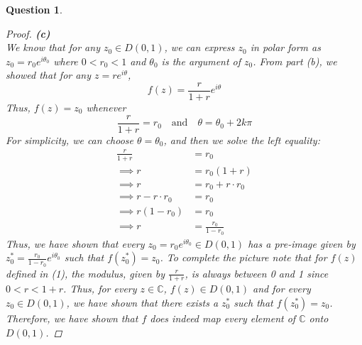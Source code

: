 \documentclass[10pt,a4paper]{article}
\newtheorem*{question*}{Question}
\begin{document}
\begin{question*}{$ $}
\begin{proof}{\textbf{(c)}}
\\We know that for any $z_0 \in D(0,1)$, we can express $z_0$ in polar form as $z_0 = r_0e^{i\theta_0}$ where $0< r_0 < 1$ and $\theta_0$ is the argument of $z_0$. From part (b), we showed that for any $z = re^{i\theta}$, 
\begin{equation}
f(z) = \frac{r}{1 + r}e^{i\theta}
\end{equation}
Thus, $f(z) = z_0$ whenever
\[\frac{r}{1 + r} = r_0 \quad \text{and} \quad \theta = \theta_0 + 2k\pi\]
For simplicity, we can choose $\theta = \theta_0$, and then we solve the left equality:
\begin{align*}
\frac{r}{1 + r} &= r_0\\
\implies r &= r_0(1 + r)\\
\implies r &= r_0 + r \cdot r_0\\
\implies r - r \cdot r_0 &= r_0\\
\implies r(1 - r_0) &= r_0\\
\implies r &= \frac{r_0}{1 - r_0}
\end{align*}
Thus, we have shown that every $z_0 = r_0e^{i\theta_0} \in D(0,1)$ has a pre-image given by $\displaystyle z_0^* = \frac{r_0}{1 - r_0}e^{i\theta_0}$ such that $f(z_0^*) = z_0$. To complete the picture note that for $f(z)$ defined in (1), the modulus, given by $\displaystyle \frac{r}{1 + r}$, is always between 0 and 1 since $0 < r < 1 + r$. Thus, for every $z \in \mathbb{C}$, $f(z) \in D(0,1)$ and for every $z_0 \in D(0,1)$, we have shown that there exists a $z_0^*$ such that $f(z_0^*) = z_0$. Therefore, we have shown that $f$ does indeed map every element of $\mathbb{C}$ onto $D(0,1)$.
\end{proof}
\end{question*}
\end{document}
